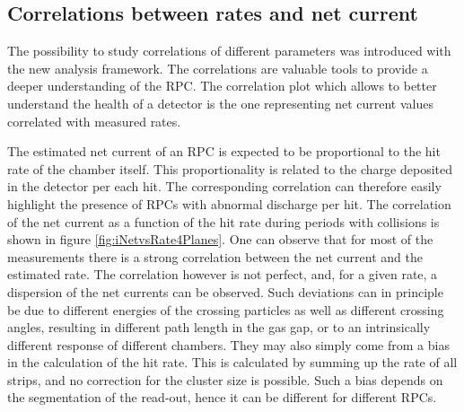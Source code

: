 \subsection{Correlations between rates and net current}
The possibility to study correlations of different parameters was introduced with the new analysis framework.
The correlations are valuable tools to provide a deeper understanding of the RPC.
The correlation plot which allows to better understand the health of a detector is the one representing net current values correlated with measured rates.

The estimated net current of an RPC is expected to be proportional to the hit rate of the chamber itself.
This proportionality is related to the charge deposited in the detector per each hit.
The corresponding correlation can therefore easily highlight the presence of RPCs with abnormal discharge per hit.
The correlation of the net current as a function of the hit rate during periods with collisions is shown in figure \ref{fig:iNetvsRate4Planes}.
One can observe that for most of the measurements there is a strong correlation between the net current and the estimated rate. 
The correlation however is not perfect, and, for a given rate, a dispersion of the net currents can be observed.
Such deviations can in principle be due to different energies of the crossing particles as well as different crossing angles, resulting in different path length in the gas gap, or to an intrinsically different response of different chambers.
They may also simply come from a bias in the calculation of the hit rate. 
This is calculated by summing up the rate of all strips, and no correction for the cluster size is possible. 
Such a bias depends on the segmentation of the read-out, hence it can be different for different RPCs.

